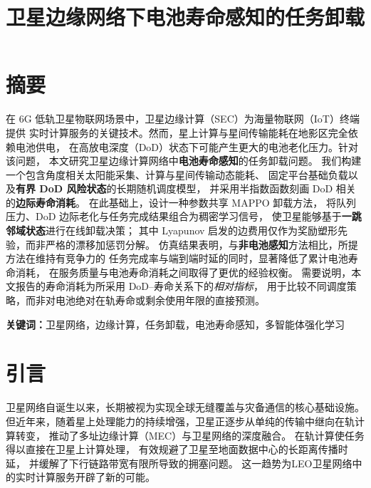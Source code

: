 \documentclass[a4paper,11pt]{article}
\begin{document}
\title{卫星边缘网络下电池寿命感知的任务卸载}
\author{}
\date{}
\maketitle

\section{摘要}

在 6G 低轨卫星物联网场景中，卫星边缘计算（SEC）为海量物联网（IoT）终端提供
实时计算服务的关键技术。然而，星上计算与星间传输能耗在地影区完全依赖电池供电，
在高放电深度（DoD）状态下可能产生更大的电池老化压力。针对该问题，
本文研究卫星边缘计算网络中\textbf{电池寿命感知}的任务卸载问题。
我们构建一个包含角度相关太阳能采集、计算与星间传输动态能耗、
固定平台基础负载以及\textbf{有界 DoD 风险状态}的长期随机调度模型，
并采用半指数函数刻画 DoD 相关的\textbf{边际寿命消耗}。
在此基础上，设计一种参数共享 MAPPO 卸载方法，
将队列压力、DoD 边际老化与任务完成结果组合为稠密学习信号，
使卫星能够基于\textbf{一跳邻域状态}进行在线卸载决策；
其中 Lyapunov 启发的边费用仅作为奖励塑形先验，而非严格的漂移加惩罚分解。
仿真结果表明，与\textbf{非电池感知}方法相比，所提方法在维持有竞争力的
任务完成率与端到端时延的同时，显著降低了累计电池寿命消耗，
在服务质量与电池寿命消耗之间取得了更优的经验权衡。
需要说明，本文报告的寿命消耗为所采用 DoD--寿命关系下的\emph{相对指标}，
用于比较不同调度策略，而非对电池绝对在轨寿命或剩余使用年限的直接预测。

\noindent\textbf{关键词：}卫星网络，边缘计算，任务卸载，电池寿命感知，多智能体强化学习

\section{引言}

卫星网络自诞生以来，长期被视为实现全球无缝覆盖与灾备通信的核心基础设施。
但近年来，随着星上处理能力的持续增强，卫星正逐步从单纯的传输中继向在轨计算转变，
推动了多址边缘计算（MEC）与卫星网络的深度融合\cite{zhang2024mhspo}。
在轨计算使任务得以直接在卫星上计算处理，
有效规避了卫星至地面数据中心的长距离传播时延，
并缓解了下行链路带宽有限所导致的拥塞问题。
这一趋势为LEO卫星网络中的实时计算服务开辟了新的可能。
\end{document}
